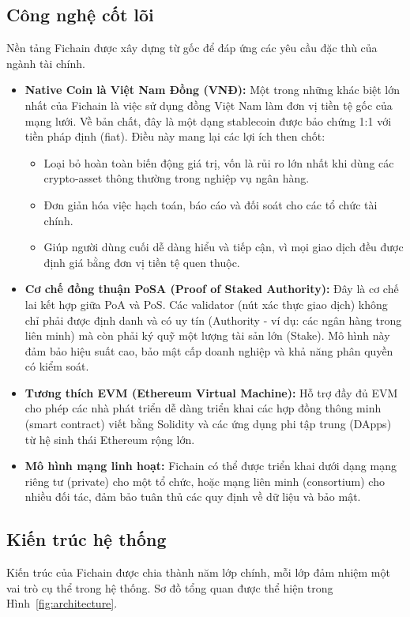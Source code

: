 \subsection{Công nghệ cốt lõi}
Nền tảng Fichain được xây dựng từ gốc để đáp ứng các yêu cầu đặc thù của ngành tài chính.
\begin{itemize}
    \item \textbf{Native Coin là Việt Nam Đồng (VNĐ):} Một trong những khác biệt lớn nhất của Fichain là việc sử dụng đồng Việt Nam làm đơn vị tiền tệ gốc của mạng lưới. Về bản chất, đây là một dạng stablecoin được bảo chứng 1:1 với tiền pháp định (fiat). Điều này mang lại các lợi ích then chốt:
    \begin{itemize}
        \item Loại bỏ hoàn toàn biến động giá trị, vốn là rủi ro lớn nhất khi dùng các crypto-asset thông thường trong nghiệp vụ ngân hàng.
        \item Đơn giản hóa việc hạch toán, báo cáo và đối soát cho các tổ chức tài chính.
        \item Giúp người dùng cuối dễ dàng hiểu và tiếp cận, vì mọi giao dịch đều được định giá bằng đơn vị tiền tệ quen thuộc.
    \end{itemize}
    
    \item \textbf{Cơ chế đồng thuận PoSA (Proof of Staked Authority):} Đây là cơ chế lai kết hợp giữa PoA và PoS. Các validator (nút xác thực giao dịch) không chỉ phải được định danh và có uy tín (Authority - ví dụ: các ngân hàng trong liên minh) mà còn phải ký quỹ một lượng tài sản lớn (Stake). Mô hình này đảm bảo hiệu suất cao, bảo mật cấp doanh nghiệp và khả năng phân quyền có kiểm soát.

    \item \textbf{Tương thích EVM (Ethereum Virtual Machine):} Hỗ trợ đầy đủ EVM cho phép các nhà phát triển dễ dàng triển khai các hợp đồng thông minh (smart contract) viết bằng Solidity và các ứng dụng phi tập trung (DApps) từ hệ sinh thái Ethereum rộng lớn.
    
    \item \textbf{Mô hình mạng linh hoạt:} Fichain có thể được triển khai dưới dạng mạng riêng tư (private) cho một tổ chức, hoặc mạng liên minh (consortium) cho nhiều đối tác, đảm bảo tuân thủ các quy định về dữ liệu và bảo mật.
\end{itemize}

\subsection{Kiến trúc hệ thống}
Kiến trúc của Fichain được chia thành năm lớp chính, mỗi lớp đảm nhiệm một vai trò cụ thể trong hệ thống. Sơ đồ tổng quan được thể hiện trong Hình~\ref{fig:architecture}.

